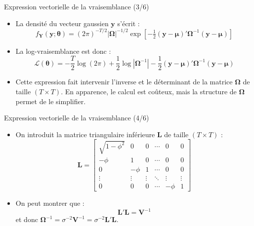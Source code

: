 \documentclass[11pt,aspectratio=169]{beamer}
\begin{document}
\begin{frame}{Expression vectorielle de la vraisemblance (3/6)}

\begin{itemize}

\item La densité du vecteur gaussien $\mathbf{y}$ s'écrit :
  \[
  f_{\mathbf{Y}}(\mathbf{y}; \bm{\theta}) = (2\pi)^{-T/2} |\bm{\Omega}|^{-1/2} \exp\!\left[-\tfrac{1}{2}(\mathbf{y} - \bm{\mu})'\bm{\Omega}^{-1}(\mathbf{y} - \bm{\mu})\right]
  \]\newline

\item La log-vraisemblance est donc :
  \[
  \boxed{\mathcal{L}(\bm{\theta}) = -\frac{T}{2}\log(2\pi) + \frac{1}{2}\log|\bm{\Omega}^{-1}| - \frac{1}{2}(\mathbf{y} - \bm{\mu})'\bm{\Omega}^{-1}(\mathbf{y} - \bm{\mu})}
  \]\newline

\item Cette expression fait intervenir l'inverse et le déterminant de la matrice $\bm{\Omega}$ de taille $(T \times T)$. En apparence, le calcul est coûteux, mais la structure de $\bm{\Omega}$ permet de le simplifier.

\end{itemize}

\end{frame}

\begin{frame}{Expression vectorielle de la vraisemblance (4/6)}

\begin{itemize}

\item On introduit la matrice triangulaire inférieure $\mathbf{L}$ de taille $(T \times T)$ :
  \[
  \mathbf{L} = \begin{bmatrix} \sqrt{1-\phi^2} & 0 & 0 & \cdots & 0 & 0 \\ -\phi & 1 & 0 & \cdots & 0 & 0 \\ 0 & -\phi & 1 & \cdots & 0 & 0 \\ \vdots & \vdots & \vdots & \ddots & \vdots & \vdots \\ 0 & 0 & 0 & \cdots & -\phi & 1 \end{bmatrix}
  \]\newline

\item On peut montrer que :
  \[
  \mathbf{L}'\mathbf{L} = \mathbf{V}^{-1}
  \]
  et donc $\bm{\Omega}^{-1} = \sigma^{-2}\mathbf{V}^{-1} = \sigma^{-2}\mathbf{L}'\mathbf{L}$.

\end{itemize}

\end{frame}
\end{document}
